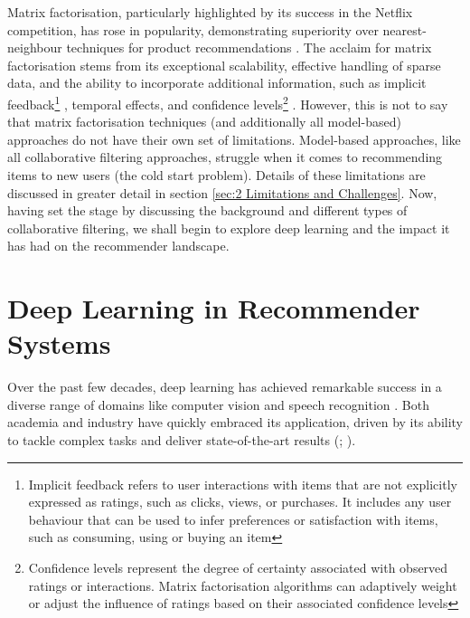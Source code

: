 Matrix factorisation, particularly highlighted by its success in the Netflix competition, has rose in popularity, demonstrating superiority over nearest-neighbour techniques for product recommendations \cite{koren2009matrix}. The acclaim for matrix factorisation stems from its exceptional scalability, effective handling of sparse data, and the ability to incorporate additional information, such as implicit feedback\footnote{Implicit feedback refers to user interactions with items that are not explicitly expressed as ratings, such as clicks, views, or purchases. It includes any user behaviour that can be used to infer preferences or satisfaction with items, such as consuming, using or buying an item} \cite{koren2009matrix}, temporal effects, and confidence levels\footnote{Confidence levels represent the degree of certainty associated with observed ratings or interactions. Matrix factorisation algorithms can adaptively weight or adjust the influence of ratings based on their associated confidence levels} \cite{koren2009matrix}. However, this is not to say that matrix factorisation techniques (and additionally all model-based) approaches do not have their own set of limitations. Model-based approaches, like all collaborative filtering approaches, struggle when it comes to recommending items to new users (the cold start problem). Details of these limitations are discussed in greater detail in section \ref{sec:2 Limitations and Challenges}.  Now, having set the stage by discussing the background and different types of collaborative filtering, we shall begin to explore deep learning and the impact it has had on the recommender landscape. 

\section{Deep Learning in Recommender Systems}
\label{sec:2 Deep Learning in Recommender Systems}

Over the past few decades, deep learning has achieved remarkable success in a diverse range of domains like computer vision and speech recognition \cite{seth2022comparative}. Both academia and industry have quickly embraced its application, driven by its ability to tackle complex tasks and deliver state-of-the-art results (\cite{cherkassky2012statistics}; \cite{clark1999scientific}). 

